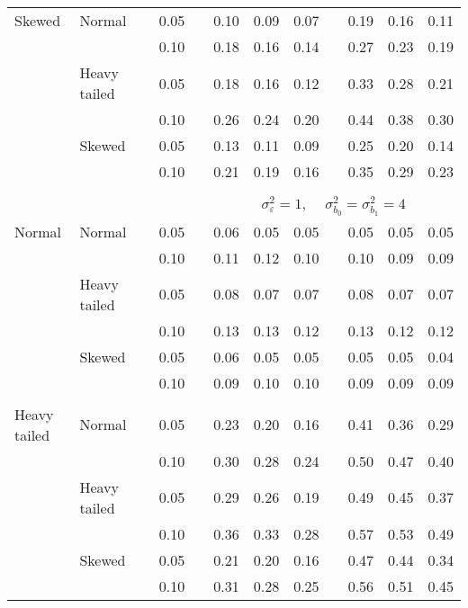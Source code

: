 \begin{table}[ht]
\begin{scriptsize}
\begin{tabular}{ll p{.1cm} c p{.1cm} rrr p{.1cm} rrr}
Skewed       & Normal       && 0.05 &&  0.10 & 0.09 & 0.07 && 0.19 & 0.16 & 0.11 \\ 
             &              && 0.10 &&  0.18 & 0.16 & 0.14 && 0.27 & 0.23 & 0.19 \\ 
             & Heavy tailed && 0.05 &&  0.18 & 0.16 & 0.12 && 0.33 & 0.28 & 0.21 \\ 
             &              && 0.10 &&  0.26 & 0.24 & 0.20 && 0.44 & 0.38 & 0.30 \\ 
             & Skewed       && 0.05 &&  0.13 & 0.11 & 0.09 && 0.25 & 0.20 & 0.14 \\ 
             &              && 0.10 &&  0.21 & 0.19 & 0.16 && 0.35 & 0.29 & 0.23 \\ 


&&&&&&&&&&&\\
& && && \multicolumn{7}{c}{$\sigma_{\varepsilon}^2 = 1$, \ \ $\sigma_{b_0}^2 = \sigma_{b_1}^2 = 4$} \\ \cline{6-12}
\rowcolor{gray!20}Normal       & Normal       && 0.05 &&  0.06 & 0.05 & 0.05 && 0.05 & 0.05 & 0.05 \\ 
\rowcolor{gray!20}             &              && 0.10 &&  0.11 & 0.12 & 0.10 && 0.10 & 0.09 & 0.09 \\ 
\rowcolor{gray!20}             & Heavy tailed && 0.05 &&  0.08 & 0.07 & 0.07 && 0.08 & 0.07 & 0.07 \\ 
\rowcolor{gray!20}             &              && 0.10 &&  0.13 & 0.13 & 0.12 && 0.13 & 0.12 & 0.12 \\ 
\rowcolor{gray!20}             & Skewed       && 0.05 &&  0.06 & 0.05 & 0.05 && 0.05 & 0.05 & 0.04 \\ 
\rowcolor{gray!20}             &              && 0.10 &&  0.09 & 0.10 & 0.10 && 0.09 & 0.09 & 0.09 \\
             &&&&&&&&&&&\\ 
Heavy tailed & Normal       && 0.05 &&  0.23 & 0.20 & 0.16 && 0.41 & 0.36 & 0.29 \\ 
             &              && 0.10 &&  0.30 & 0.28 & 0.24 && 0.50 & 0.47 & 0.40 \\ 
             & Heavy tailed && 0.05 &&  0.29 & 0.26 & 0.19 && 0.49 & 0.45 & 0.37 \\ 
             &              && 0.10 &&  0.36 & 0.33 & 0.28 && 0.57 & 0.53 & 0.49 \\ 
             & Skewed       && 0.05 &&  0.21 & 0.20 & 0.16 && 0.47 & 0.44 & 0.34 \\ 
             &              && 0.10 &&  0.31 & 0.28 & 0.25 && 0.56 & 0.51 & 0.45 \\ 

\end{tabular}
\end{scriptsize}
\end{table}
